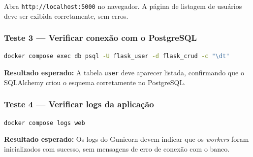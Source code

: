 \documentclass[12pt,a4paper]{article}
\begin{document}
Abra \texttt{http://localhost:5000} no navegador. A página de listagem de usuários
deve ser exibida corretamente, sem erros.





\subsubsection{Teste 3 — Verificar conexão com o PostgreSQL}

\begin{lstlisting}[language=bash, caption={Verificação direta no banco PostgreSQL.}]
docker compose exec db psql -U flask_user -d flask_crud -c "\dt"
\end{lstlisting}

\textbf{Resultado esperado:} A tabela \texttt{user} deve aparecer listada,
confirmando que o SQLAlchemy criou o esquema corretamente no PostgreSQL.

\subsubsection{Teste 4 — Verificar logs da aplicação}

\begin{lstlisting}[language=bash, caption={Inspeção de logs para identificar erros.}]
docker compose logs web
\end{lstlisting}

\textbf{Resultado esperado:} Os logs do Gunicorn devem indicar que os
\textit{workers} foram inicializados com sucesso, sem mensagens de erro de conexão
com o banco.
\end{document}
